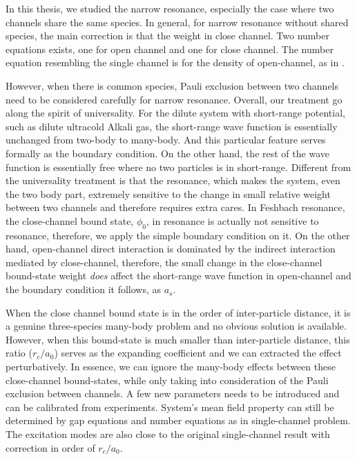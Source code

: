 % 
In this thesis, we studied the narrow resonance, especially the case where two channels share the same species.  In general, for narrow resonance without shared species, the main correction is that the weight in close channel.  Two number equations exists, one for open channel and one for close channel.  The number equation resembling the single channel is for the density of open-channel, as in  \cite{GurarieNarrow}.  

However, when there is common species,  Pauli exclusion between two channels need to be considered carefully for narrow resonance.  Overall, our treatment go along the spirit of universality.  For the dilute system with short-range potential, such as dilute ultracold Alkali gas, the short-range wave function is essentially unchanged from two-body  to many-body.  And this particular feature serves formally as the boundary condition.  On the other hand, the rest of the wave function is essentially free where no two particles is in short-range.  Different from the universality treatment is that the resonance, which makes the system, even the two body part, extremely sensitive to the change in small relative weight between two channels and therefore requires extra cares.  In Feshbach resonance, the close-channel bound state, $\phi_{0}$, in resonance is actually not sensitive to resonance, therefore, we apply the simple boundary condition on it. On the other hand, open-channel direct interaction is dominated by the indirect interaction mediated by close-channel, therefore, the small change in the close-channel bound-state weight \emph{does} affect the short-range wave function in open-channel and the boundary condition it follows, as $a_{s}$. 

When the close channel bound state is in the order of   inter-particle distance, it is a genuine three-species many-body problem and no obvious solution is available.  However, when this bound-state is much smaller than inter-particle distance, this ratio ($r_{c}/a_{0}$) serves as the expanding coefficient and we can extracted the effect perturbatively.  In essence, we can ignore the many-body effects between these close-channel bound-states, while only taking into consideration of the Pauli exclusion between channels.  A few new parameters needs to be introduced and can be calibrated from experiments.  System's mean field property can still be determined by gap equations and number equations as in single-channel problem.  The excitation modes are also close to the original single-channel result with correction in order of $r_{c}/a_{0}$.

